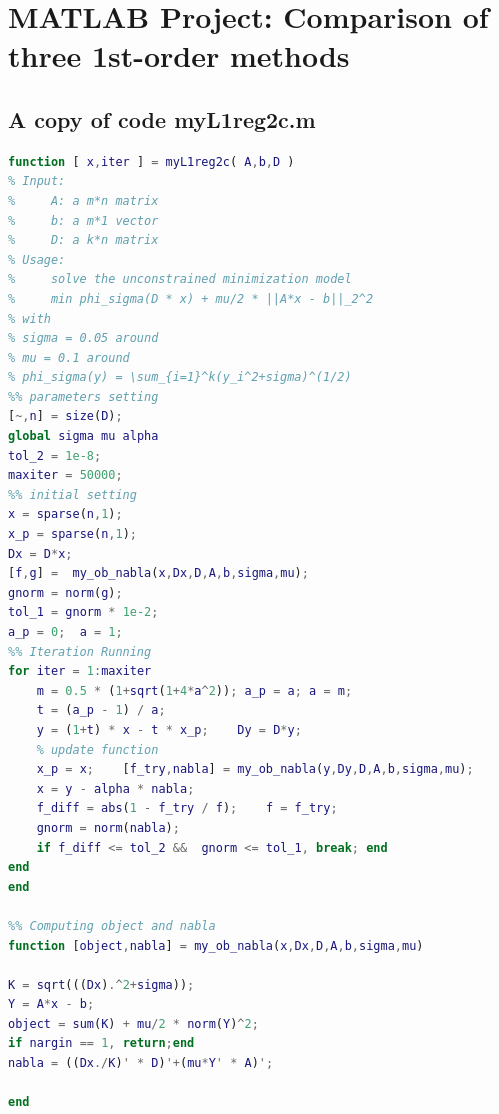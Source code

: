 \clearpage
\section{MATLAB Project: Comparison of three 1st-order methods}

\subsection{A copy of code \textrm{myL1reg2c.m}}
\begin{lstlisting}[language=matlab]
function [ x,iter ] = myL1reg2c( A,b,D )
% Input: 
%     A: a m*n matrix
%     b: a m*1 vector
%     D: a k*n matrix
% Usage:
%     solve the unconstrained minimization model
%     min phi_sigma(D * x) + mu/2 * ||A*x - b||_2^2
% with
% sigma = 0.05 around
% mu = 0.1 around
% phi_sigma(y) = \sum_{i=1}^k(y_i^2+sigma)^(1/2)
%% parameters setting
[~,n] = size(D);
global sigma mu alpha
tol_2 = 1e-8;
maxiter = 50000;    
%% initial setting 
x = sparse(n,1);  
x_p = sparse(n,1);
Dx = D*x;  
[f,g] =  my_ob_nabla(x,Dx,D,A,b,sigma,mu);  
gnorm = norm(g);
tol_1 = gnorm * 1e-2;
a_p = 0;  a = 1;
%% Iteration Running
for iter = 1:maxiter
    m = 0.5 * (1+sqrt(1+4*a^2)); a_p = a; a = m;
    t = (a_p - 1) / a;
    y = (1+t) * x - t * x_p;    Dy = D*y;
    % update function
    x_p = x;    [f_try,nabla] = my_ob_nabla(y,Dy,D,A,b,sigma,mu);
    x = y - alpha * nabla;
    f_diff = abs(1 - f_try / f);    f = f_try;  
    gnorm = norm(nabla);
    if f_diff <= tol_2 &&  gnorm <= tol_1, break; end
end
end

%% Computing object and nabla
function [object,nabla] = my_ob_nabla(x,Dx,D,A,b,sigma,mu)

K = sqrt(((Dx).^2+sigma));
Y = A*x - b;
object = sum(K) + mu/2 * norm(Y)^2;
if nargin == 1, return;end
nabla = ((Dx./K)' * D)'+(mu*Y' * A)';

end
\end{lstlisting}
